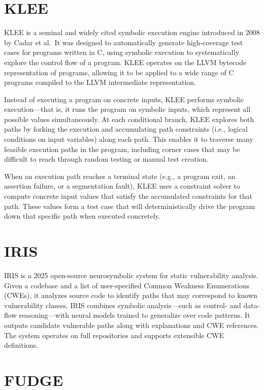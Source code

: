 \documentclass[
  a4paper,
]{scrreprt}
\theoremstyle{definition}
\theoremstyle{remark}
\begin{document}
\section{KLEE}\label{klee}

KLEE \autocite{klee} is a seminal and widely cited symbolic execution
engine introduced in 2008 by Cadar et al.~It was designed to
automatically generate high-coverage test cases for programs written in
C, using symbolic execution to systematically explore the control flow
of a program. KLEE operates on the LLVM \autocite{llvm} bytecode
representation of programs, allowing it to be applied to a wide range of
C programs compiled to the LLVM intermediate representation.

Instead of executing a program on concrete inputs, KLEE performs
symbolic execution---that is, it runs the program on symbolic inputs,
which represent all possible values simultaneously. At each conditional
branch, KLEE explores both paths by forking the execution and
accumulating path constraints (i.e., logical conditions on input
variables) along each path. This enables it to traverse many feasible
execution paths in the program, including corner cases that may be
difficult to reach through random testing or manual test creation.

When an execution path reaches a terminal state (e.g., a program exit,
an assertion failure, or a segmentation fault), KLEE uses a constraint
solver to compute concrete input values that satisfy the accumulated
constraints for that path. These values form a test case that will
deterministically drive the program down that specific path when
executed concretely.

\section{IRIS}\label{iris}

IRIS \autocite{iris} is a 2025 open-source neurosymbolic system for
static vulnerability analysis. Given a codebase and a list of
user-specified Common Weakness Enumerations (CWEs), it analyzes source
code to identify paths that may correspond to known vulnerability
classes. IRIS combines symbolic analysis---such as control- and
data-flow reasoning---with neural models trained to generalize over code
patterns. It outputs candidate vulnerable paths along with explanations
and CWE references. The system operates on full repositories and
supports extensible CWE definitions.

\section{FUDGE}\label{fudge}
\end{document}
